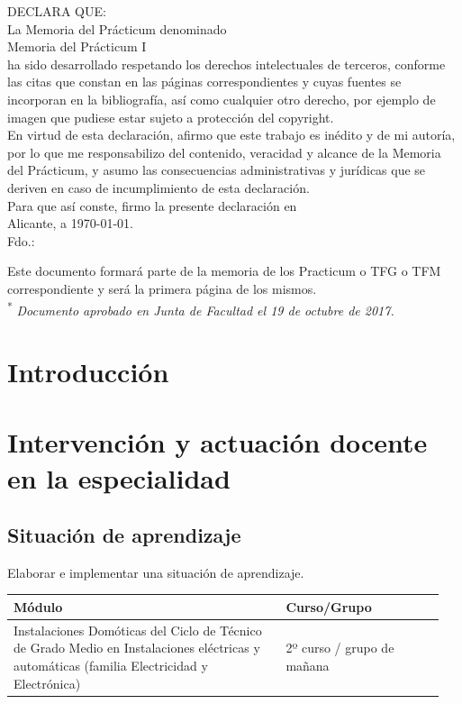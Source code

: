 \documentclass[a4paper,12pt]{report}
\begin{document}
DECLARA QUE:\\
La Memoria del Prácticum denominado\\
Memoria del Prácticum I\\
ha sido desarrollado respetando los derechos intelectuales de terceros, conforme las citas que 
constan en las páginas correspondientes y cuyas fuentes se incorporan en la bibliografía, así 
como cualquier otro derecho, por ejemplo de imagen que pudiese estar sujeto a protección 
del copyright.\\

En virtud de esta declaración, afirmo que este trabajo es inédito y de mi autoría, por lo que me 
responsabilizo del contenido, veracidad y alcance de la Memoria del Prácticum, y asumo las consecuencias administrativas y jurídicas 
que se deriven en caso de incumplimiento de esta declaración.\\

Para que así conste, firmo la presente declaración en \\
Alicante, a \today. \\

Fdo.:  \
\vspace{4\baselineskip}\

Este documento formará parte de la memoria de los Practicum o TFG o TFM correspondiente y 
será la primera página de los mismos.\\

\textsuperscript{*}	\textit{Documento aprobado en Junta de Facultad el 19 de octubre de 2017.}\\

\renewcommand{\contentsname}{Índice}
\tableofcontents
\newpage

\chapter{Introducción}


\chapter{Intervención y actuación docente en la especialidad}


    \section{Situación de aprendizaje}
    Elaborar e implementar una situación de aprendizaje.

    \begin{table}[]
        \centering
        \begin{tabular}{| p{0.6\linewidth} | p{0.35\linewidth} |}
        \rowcolor[HTML]{86F1E0} 
        \hline
        \textbf{Módulo} & \textbf{Curso/Grupo}   \\
        \hline
        Instalaciones Domóticas del Ciclo de Técnico de Grado Medio en Instalaciones eléctricas y automáticas (familia Electricidad y Electrónica) & 2º curso / grupo de mañana \\
        \hline
        \end{tabular}
    \end{table}
\end{document}
